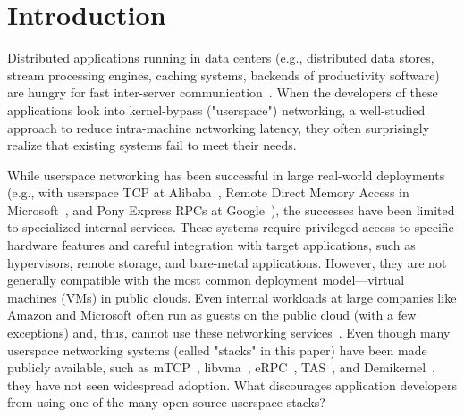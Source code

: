 \section{Introduction}
\label{sec:intro}

Distributed applications running in data centers (e.g., distributed data stores, stream processing engines, caching systems, backends of productivity software) are hungry for fast inter-server communication~\cite{PRISM, Chardonnay2023OSDI, farm, kv-driect}.
When the developers of these applications look into kernel-bypass ("userspace") networking, a well-studied approach to reduce intra-machine networking latency, they often surprisingly realize that existing systems fail to meet their needs.

While userspace networking has been successful in large real-world deployments (e.g., with userspace TCP at Alibaba~\cite{luna}, Remote Direct Memory Access in Microsoft~\cite{Bai:nsdi23}, and Pony Express RPCs at Google~\cite{snap}), the successes have been limited to specialized internal services.
These systems require privileged access to specific hardware features and careful integration with target applications, such as hypervisors, remote storage, and bare-metal applications.
However, they are not generally compatible with the most common deployment model—virtual machines (VMs) in public clouds.
Even internal workloads at large companies like Amazon and Microsoft often run as guests on the public cloud (with a few exceptions) and, thus, cannot use these networking services~\cite{microsoft-on-azure}.
Even though many userspace networking systems (called "stacks" in this paper) have been made publicly available, such as  mTCP~\cite{mtcp}, libvma~\cite{libvma}, eRPC~\cite{erpc}, TAS~\cite{tas}, and Demikernel~\cite{demi-kernel}, they have not seen widespread adoption.
What discourages application developers from using one of the many open-source userspace stacks?

